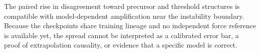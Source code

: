 The paired rise in disagreement toward precursor and threshold structures is compatible with model-dependent amplification near the instability boundary. Because the checkpoints share training lineage and no independent force reference is available yet, the spread cannot be interpreted as a calibrated error bar, a proof of extrapolation causality, or evidence that a specific model is correct.
